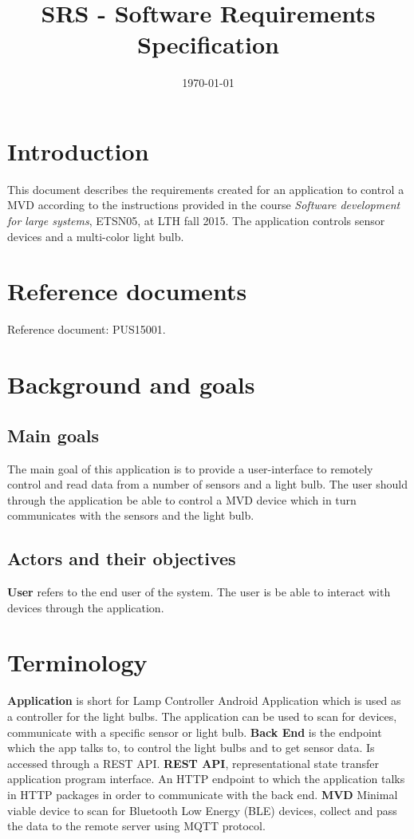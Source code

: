 \documentclass[a4paper]{article}
\title{SRS - Software Requirements Specification}
\date{\today}
\begin{document}
\maketitle


\pagebreak
\setcounter{tocdepth}{2}
\tableofcontents
\pagebreak

\section{Introduction}
This document describes the requirements created for an application to control a MVD according to the instructions provided in the course \textit{Software development for large systems}, ETSN05, at LTH fall 2015.  The application controls sensor devices and a multi-color light bulb.
\section{Reference documents}
Reference document: PUS15001.
\section{Background and goals}
\subsection{Main goals}
The main goal of this application is to provide a user-interface to remotely control and read data from a number of sensors and a light bulb. The user should through the application be able to control a MVD device which in turn communicates with the sensors and the light bulb.
\subsection{Actors and their objectives}

\textbf{User} refers to the end user of the system. The user is be able to interact with devices through the application. 

\section{Terminology}

\textbf{Application} is short for Lamp Controller Android Application which is used as a controller for the light bulbs. The application can be used to scan for devices, communicate with a specific sensor or light bulb. 
\newline \newline
\textbf{Back End} is the endpoint which the app talks to, to control the light bulbs and to get sensor data. Is accessed through a REST API. 
\newline \newline
\textbf{REST API}, representational state transfer application program interface. An HTTP endpoint to which the application talks in HTTP packages in order to communicate with the back end. 
\newline \newline
\textbf{MVD} Minimal viable device to scan for Bluetooth Low Energy (BLE) devices, collect and pass the data to the remote server using MQTT protocol.
\end{document}

